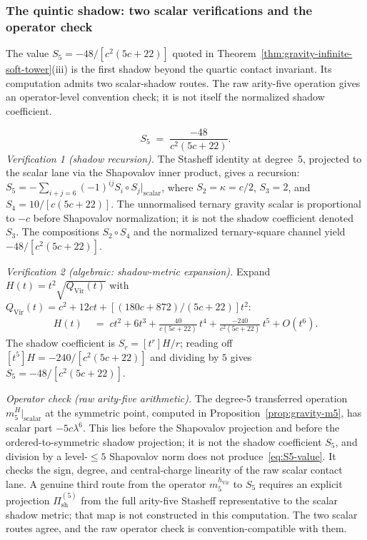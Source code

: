 \subsubsection*{The quintic shadow: two scalar verifications and
the operator check}

The value $S_5 = -48/[c^2(5c+22)]$ quoted in
Theorem~\ref{thm:gravity-infinite-soft-tower}(iii) is the first
shadow beyond the quartic contact invariant. Its computation
admits two scalar-shadow routes. The raw arity-five operation gives an
operator-level convention check; it is not itself the normalized shadow
coefficient.

\begin{computation}
\label{comp:S5-verification}%
%
\begin{equation}\label{eq:S5-value}
S_5
\;=\;
\frac{-48}{c^2(5c+22)}.
\end{equation}
\emph{Verification 1 \textup{(shadow recursion).}}
The Stasheff identity at degree~$5$, projected to the scalar lane
via the Shapovalov inner product, gives a recursion:
$S_5 = -\sum_{i+j=6}(-1)^{ij}S_i \circ S_j|_{\text{scalar}}$,
where $S_2 = \kappa = c/2$, $S_3=2$, and
$S_4 = 10/[c(5c+22)]$.  The unnormalised ternary gravity scalar is
proportional to $-c$ before Shapovalov normalization; it is not the
shadow coefficient denoted $S_3$.  The
compositions $S_2 \circ S_4$ and the normalized ternary-square channel
yield $-48/[c^2(5c+22)]$.

\emph{Verification 2 \textup{(algebraic: shadow-metric expansion).}}
Expand $H(t) = t^2\sqrt{Q_{\mathrm{Vir}}(t)}$ with
$Q_{\mathrm{Vir}}(t) = c^2 + 12ct + [(180c+872)/(5c+22)]t^2$:
\begin{align*}
H(t) &\;=\; ct^2 + 6t^3
 + \frac{40}{c(5c+22)}\,t^4
 + \frac{-240}{c^2(5c+22)}\,t^5 + O(t^6).
\end{align*}
The shadow coefficient is $S_r = [t^r]H/r$; reading off
$[t^5]H = -240/[c^2(5c+22)]$ and dividing by $5$ gives
$S_5 = -48/[c^2(5c+22)]$.

\emph{Operator check \textup{(raw arity-five arithmetic).}}
The degree-$5$ transferred operation $m_5^H|_{\text{scalar}}$
at the symmetric point, computed in
Proposition~\textup{\ref{prop:gravity-m5}}, has scalar part
$-5c\lambda^6$. This lies before the Shapovalov projection and before
the ordered-to-symmetric shadow projection; it is not the shadow
coefficient \(S_5\), and division by a level-$\le5$ Shapovalov norm
does not produce~\eqref{eq:S5-value}.  It checks the sign, degree, and
central-charge linearity of the raw scalar contact lane. A genuine third
route from the operator \(m_5^{h_{\mathrm{Vir}}}\) to
\(S_5\) requires an explicit projection
\(\Pi^{(5)}_{\mathrm{sh}}\) from the full arity-five Stasheff
representative to the scalar shadow metric; that map is not constructed
in this computation. The two scalar routes agree, and the raw operator
check is convention-compatible with them.
\end{computation}

